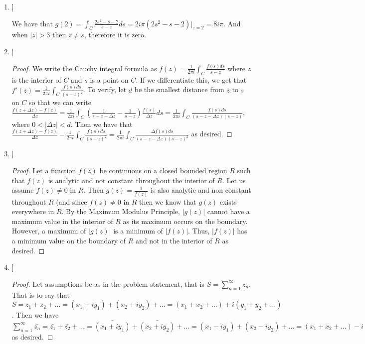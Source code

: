 \documentclass{article}
\theoremstyle{definition}
\begin{document}
\begin{enumerate}
\begin{enumerate}
    \end{enumerate}
    
    \item [[\phantom{-}3]]
    
    We have that $g(2) = \int_C\frac{2s^2 - s - 2}{s - z}ds = 2i\pi(2s^2 - s - 2)|_{z = 2} = 8i\pi$. And when $|z| > 3$ then $z \neq s$, therefore it is zero.
    
    \item [[\phantom{-}6]]
    
    \begin{proof}
    We write the Cauchy integral formula as $f(z) = \frac{1}{2\pi i}\int_C\frac{f(s)ds}{s-z}$ where $z$ is the interior of $C$ and $s$ is a point on $C$. If we differentiate this, we get that $f'(z) = \frac{1}{2\pi i}\int_C\frac{f(s)ds}{(s-z)^2}$. To verify, let $d$ be the smallest distance from $z$ to $s$ on $C$ so that we can write $\frac{f(z + \Delta z) - f(z)}{\Delta z} = \frac{1}{2\pi i}\int_C(\frac{1}{s - z - \Delta z} - \frac{1}{s - z})\frac{f(s)}{\Delta z}ds = \frac{1}{2\pi i}\int_C\frac{f(s)ds}{(s - z - \Delta z)(s - z)}$, where $0 < |\Delta z| < d$. Then we have that $\frac{f(z + \Delta z) - f(z)}{\Delta z} - \frac{1}{2\pi i}\int_C\frac{f(s)ds}{(s-z)^2} = \frac{1}{2\pi i}\int_C\frac{\Delta f(s)ds}{(s - z - \Delta z)(s - z)^2}$ as desired.
    \end{proof}
    
    \item [[\phantom{-}5]]
    
    \begin{proof}
    Let a function $f(z)$ be continuous on a closed bounded region $R$ such that $f(z)$ is analytic and not constant throughout the interior of $R$. Let us assume $f(z) \neq 0$ in $R$. Then $g(z) = \frac{1}{f(z)}$ is also analytic and non constant throughout $R$ (and since $f(z) \neq 0$ in $R$ then we know that $g(z)$ exists everywhere in $R$. By the Maximum Modulus Principle, $|g(z)|$ cannot have a maximum value in the interior of $R$ as its maximum occurs on the boundary. However, a maximum of $|g(z)|$ is a minimum of $|f(z)|$. Thus, $|f(z)|$ has a minimum value on the boundary of $R$ and not in the interior of $R$ as desired.
    \end{proof}
    
    \item [[\phantom{-}6]]
    
    \begin{proof}
    Let assumptions be as in the problem statement, that is $S = \sum_{n = 1}^\infty z_n$. That is to say that $S = z_1 + z_2 + ... = (x_1 + iy_1) + (x_2 + iy_2) + ... = (x_1 + x_2 + ...) + i(y_1 + y_2 + ...)$. Then we have $\sum_{n = 1}^\infty \bar{z_n} = \bar{z_1} + \bar{z_2} + ... = \bar{(x_1 + iy_1)} + \bar{(x_2 + iy_2)} + ... = (x_1 - iy_1) + (x_2 - iy_2) + ... = (x_1 + x_2 + ...) - i(y_1 + y_2 - ...) = \bar{(x_1 + x_2 + ...) - i(y_1 + y_2 + ...)} = \bar{S}$ as desired.
    \end{proof}
    
\end{enumerate}
\end{document}
